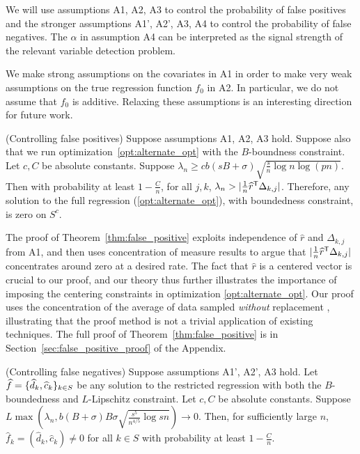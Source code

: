 We will use assumptions A1, A2, A3 to control the probability of false positives and the stronger assumptions A1', A2', A3, A4 to control the probability of false negatives. The $\alpha$ in assumption A4 can be interpreted as the signal strength of the relevant variable detection problem.

\begin{remark}
  We make strong assumptions on the covariates in A1 in order to make
  very weak assumptions on the true regression function $f_0$ in
  A2. In particular, we do not assume that $f_0$ is additive. Relaxing
  these assumptions is an interesting direction for future work.
\end{remark}

\begin{theorem} (Controlling false positives) 
\label{thm:false_positive}
Suppose assumptions A1, A2, A3 hold. Suppose also that we run optimization~\eqref{opt:alternate_opt} with the $B$-boundness constraint. Let $c,C$ be absolute constants.
Suppose $\lambda_n \geq c b (sB + \sigma) \sqrt{ \frac{s}{n} \log n
  \log (pn)}$.  Then with probability at least $ 1 - \frac{C}{n}$, for all $j,k$, $\lambda_n >  | \frac{1}{n} \widehat{r}^{\mathsf{T}} \Delta_{k,j}|$.
Therefore, any solution to the full regression (\ref{opt:alternate_opt}), with boundedness constraint, is zero on $S^c$. 
\end{theorem}

The proof of Theorem~\ref{thm:false_positive} exploits independence of
$\hat{r}$ and $\Delta_{k,j}$ from A1, and then uses concentration of
measure results to argue that $| \frac{1}{n} \widehat{r}^{\mathsf{T}}
\Delta_{k,j}|$ concentrates around zero at a desired rate. The fact
that $\hat{r}$ is a centered vector is crucial to our proof, and our
theory thus further illustrates the importance of imposing the
centering constraints in optimization \eqref{opt:alternate_opt}. Our
proof uses the concentration of the average of
data sampled \emph{without} replacement
\cite{serfling1974probability}, illustrating that the proof method is not a
trivial application of existing techniques. The full proof of
Theorem~\ref{thm:false_positive} is in
Section~\ref{sec:false_positive_proof} of the Appendix.

\begin{theorem} (Controlling false negatives)
\label{thm:false_negative}
Suppose assumptions A1', A2', A3 hold. Let $\displaystyle \widehat{f} = \{ \widehat{d}_k, \widehat{c}_k\}_{k\in S}$ be any solution to the restricted regression with both the $B$-boundedness and $L$-Lipschitz constraint. Let $c,C$ be absolute constants.
Suppose $L \max \left(\lambda_n, b (B+\sigma)B\sigma \sqrt{\frac{s^5}{n^{4/5}} \log sn} \right) \rightarrow 0$.
Then, for sufficiently large $n$, $\hat{f}_k = (\hat{d}_k, \hat{c}_k)
\neq 0$ for all $k \in S$ with probability at least $1-\frac{C}{n}$.
\end{theorem}

